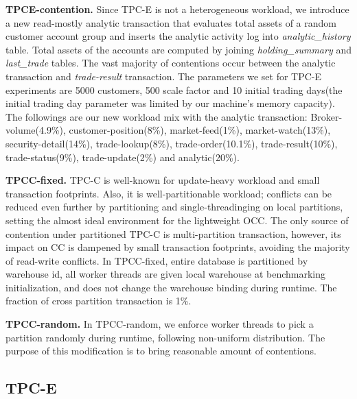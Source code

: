 \textbf{TPCE-contention.}
Since TPC-E is not a heterogeneous workload, we introduce a new read-mostly analytic transaction that evaluates total assets of a random customer account group and inserts the analytic activity log into \textit{analytic\_history} table. Total assets of the accounts are computed by joining \textit{holding\_summary} and \textit{last\_trade} tables. The vast majority of contentions occur between the analytic transaction and \textit{trade-result} transaction. The parameters we set for TPC-E experiments are 5000 customers, 500 scale factor and 10 initial trading days(the initial trading day parameter was limited by our machine's memory capacity). The followings are our new workload mix with the analytic transaction: Broker-volume(4.9\%), customer-position(8\%), market-feed(1\%), market-watch(13\%), security-detail(14\%), trade-lookup(8\%), trade-order(10.1\%), trade-result(10\%), trade-status(9\%), trade-update(2\%) and analytic(20\%). 


\textbf{TPCC-fixed.}
TPC-C is well-known for update-heavy workload and small transaction footprints. Also, it is well-partitionable workload; conflicts can be reduced even further by partitioning and single-threadinging on local partitions, setting the almost ideal environment for the lightweight OCC. The only source of contention under partitioned TPC-C is multi-partition transaction, however, its impact on CC is dampened by small transaction footprints, avoiding the majority of read-write conflicts. In TPCC-fixed, entire database is partitioned by warehouse id, all worker threads are given local warehouse at benchmarking initialization, and does not change the warehouse binding during runtime. The fraction of cross partition transaction is 1\%. 


\textbf{TPCC-random.}
In TPCC-random, we enforce worker threads to pick a partition randomly during runtime, following non-uniform distribution. The purpose of this modification is to bring reasonable amount of contentions.  

\subsection{TPC-E}


